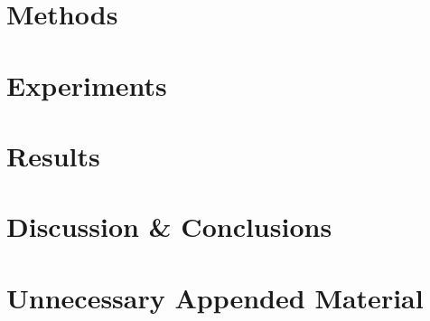 \documentclass{kththesis}
\theoremstyle{definition}
\begin{document}
\chapter{Methods}

\chapter{Experiments}

\chapter{Results}

\chapter{Discussion \& Conclusions}

\printbibliography[heading=bibintoc] %

\appendix

\chapter{Unnecessary Appended Material}
\end{document}
